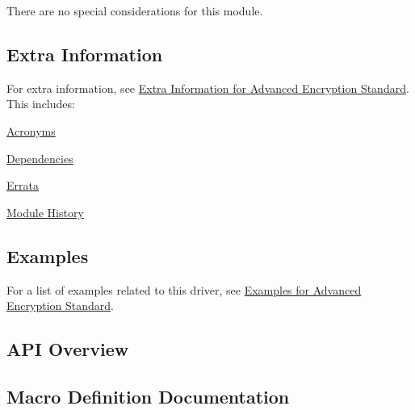 There are no special considerations for this module.\hypertarget{group__asfdoc__sam0__drivers__aes__group_asfdoc_sam0_drivers_aes_extra_info}{}\subsection{Extra Information}\label{group__asfdoc__sam0__drivers__aes__group_asfdoc_sam0_drivers_aes_extra_info}
For extra information, see \hyperlink{asfdoc_sam0_drivers_aes_extra}{Extra Information for Advanced Encryption Standard}. This includes\+:
\begin{DoxyItemize}
\item \hyperlink{asfdoc_sam0_drivers_aes_extra_asfdoc_sam0_drivers_aes_extra_acronyms}{Acronyms}
\item \hyperlink{asfdoc_sam0_drivers_aes_extra_asfdoc_sam0_drivers_aes_extra_dependencies}{Dependencies}
\item \hyperlink{asfdoc_sam0_drivers_aes_extra_asfdoc_sam0_drivers_aes_extra_errata}{Errata}
\item \hyperlink{asfdoc_sam0_drivers_aes_extra_asfdoc_sam0_drivers_aes_extra_history}{Module History}
\end{DoxyItemize}\hypertarget{group__asfdoc__sam0__drivers__aes__group_asfdoc_sam0_drivers_aes_examples}{}\subsection{Examples}\label{group__asfdoc__sam0__drivers__aes__group_asfdoc_sam0_drivers_aes_examples}
For a list of examples related to this driver, see \hyperlink{asfdoc_sam0_drivers_aes_exqsg}{Examples for Advanced Encryption Standard}.\hypertarget{group__asfdoc__sam0__drivers__aes__group_asfdoc_sam0_drivers_aes_api_overview}{}\subsection{A\+P\+I Overview}\label{group__asfdoc__sam0__drivers__aes__group_asfdoc_sam0_drivers_aes_api_overview}


\subsection{Macro Definition Documentation}
\hypertarget{group__asfdoc__sam0__drivers__aes__group_ga4bede6c9fbc7ad0a60b8a0f72e07b45e}{}
